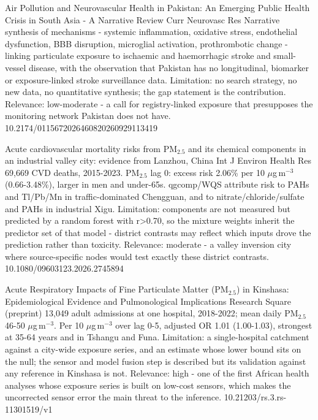\documentclass[10pt]{article}
\begin{document}
{Air Pollution and Neurovascular Health in Pakistan: An Emerging Public Health Crisis in South Asia - A Narrative Review}
{Curr Neurovasc Res}
{Narrative synthesis of mechanisms - systemic inflammation, oxidative stress, endothelial dysfunction, BBB disruption, microglial activation, prothrombotic change - linking particulate exposure to ischaemic and haemorrhagic stroke and small-vessel disease, with the observation that Pakistan has no longitudinal, biomarker or exposure-linked stroke surveillance data. Limitation: no search strategy, no new data, no quantitative synthesis; the gap statement is the contribution. Relevance: low-moderate - a call for registry-linked exposure that presupposes the monitoring network Pakistan does not have.}
{10.2174/0115672026460820260929113419}

\par{}\baselineskip{}\baselineskip
{}

{Acute cardiovascular mortality risks from PM$_{2.5}$ and its chemical components in an industrial valley city: evidence from Lanzhou, China}
{Int J Environ Health Res}
{69,669 CVD deaths, 2015-2023. PM$_{2.5}$ lag 0: excess risk 2.06\% per 10 $\mu$g\,m$^{-3}$ (0.66-3.48\%), larger in men and under-65s. qgcomp/WQS attribute risk to PAHs and Tl/Pb/Mn in traffic-dominated Chengguan, and to nitrate/chloride/sulfate and PAHs in industrial Xigu. Limitation: components are not measured but predicted by a random forest with r>0.70, so the mixture weights inherit the predictor set of that model - district contrasts may reflect which inputs drove the prediction rather than toxicity. Relevance: moderate - a valley inversion city where source-specific nodes would test exactly these district contrasts.}
{10.1080/09603123.2026.2745894}

\par{}\baselineskip{}\baselineskip
{}

{Acute Respiratory Impacts of Fine Particulate Matter (PM$_{2.5}$) in Kinshasa: Epidemiological Evidence and Pulmonological Implications}
{Research Square (preprint)}
{13,049 adult admissions at one hospital, 2018-2022; mean daily PM$_{2.5}$ 46-50 $\mu$g\,m$^{-3}$. Per 10 $\mu$g\,m$^{-3}$ over lag 0-5, adjusted OR 1.01 (1.00-1.03), strongest at 35-64 years and in Tshangu and Funa. Limitation: a single-hospital catchment against a city-wide exposure series, and an estimate whose lower bound sits on the null; the sensor and model fusion step is described but its validation against any reference in Kinshasa is not. Relevance: high - one of the first African health analyses whose exposure series is built on low-cost sensors, which makes the uncorrected sensor error the main threat to the inference.}
{10.21203/rs.3.rs-11301519/v1}
\end{document}
